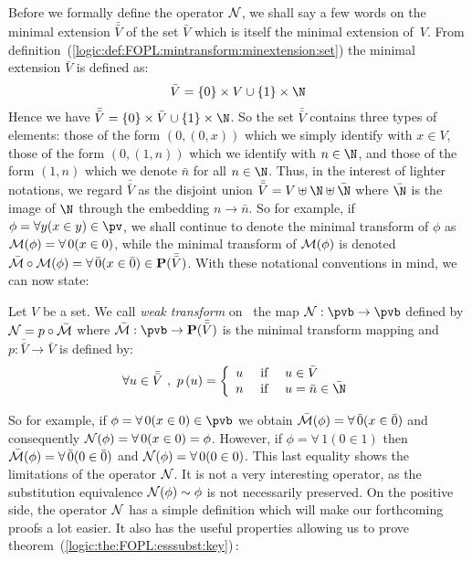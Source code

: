 Before we formally define the operator ${\cal N}$, we shall say a
few words on the minimal extension $\bar{\bar{V}}$ of the set
$\bar{V}$ which is itself the minimal extension of~$V$. From
definition~(\ref{logic:def:FOPL:mintransform:minextension:set}) the
minimal extension $\bar{V}$ is defined as:
    \[
    \bar{V}=\{0\}\times V\cup\{1\}\times\N
    \]
Hence we have $\bar{\bar{V}}=\{0\}\times\bar{V}\cup\{1\}\times\N$.
So the set $\bar{\bar{V}}$ contains three types of elements: those
of the form $(0,(0,x))$ which we simply identify with $x\in V$,
those of the form $(0,(1,n))$ which we identify with $n\in\N$, and
those of the form $(1,n)$ which we denote $\bar{n}$ for all
$n\in\N$. Thus, in the interest of lighter notations, we regard
$\bar{\bar{V}}$ as the disjoint union
$\bar{\bar{V}}=V\uplus\N\uplus\bar{\N}$ where $\bar{\N}$ is the
image of $\N$ through the embedding $n\to\bar{n}$. So for example,
if $\phi=\forall y(x\in y)\in\pv$, we shall continue to denote the
minimal transform of $\phi$ as ${\cal M}(\phi)=\forall\,0(x\in 0)$,
while the minimal transform of ${\cal M}(\phi)$ is denoted
$\bar{\cal M}\circ{\cal
M}(\phi)=\forall\,\bar{0}(x\in\bar{0})\in{\bf P}(\bar{\bar{V}})$.
With these notational conventions in mind, we can now state:

\begin{defin}\label{logic:def:FOPL:esssubst:weak:transform}
Let $V$ be a set. We call {\em weak transform} on \pvb\ the map
${\cal N}:\pvb\to\pvb$ defined by ${\cal N}=p\circ\bar{\cal M}$
where $\bar{\cal M}:\pvb\to{\bf P}(\bar{\bar{V}})$ is the minimal
transform mapping and $p:\bar{\bar{V}}\to\bar{V}$ is defined by:
    \[
    \forall u\in\bar{\bar{V}}\ ,\ p\,(u)=\left\{
        \begin{array}{lcl}
        u&\mbox{\ if\ }&u\in\bar{V}\\
        n&\mbox{\ if\ }&u=\bar{n}\in\bar{\N}
        \end{array}
    \right.
    \]
\end{defin}
So for example, if $\phi=\forall\,0(x\in 0)\in\pvb$ we obtain
$\bar{\cal M}(\phi)=\forall\,\bar{0}(x\in \bar{0})$ and consequently
${\cal N}(\phi)=\forall\,0(x\in 0)=\phi$. However, if
$\phi=\forall\,1(0\in 1)$ then $\bar{\cal
M}(\phi)=\forall\,\bar{0}(0\in \bar{0})$ and ${\cal
N}(\phi)=\forall\,0(0\in 0)$. This last equality shows the
limitations of the operator ${\cal N}$. It is not a very interesting
operator, as the substitution equivalence ${\cal N}(\phi)\sim\phi$
is not necessarily preserved. On the positive side, the operator
${\cal N}$ has a simple definition which will make our forthcoming
proofs a lot easier. It also has the useful properties allowing us
to prove theorem~(\ref{logic:the:FOPL:esssubst:key})\,:

